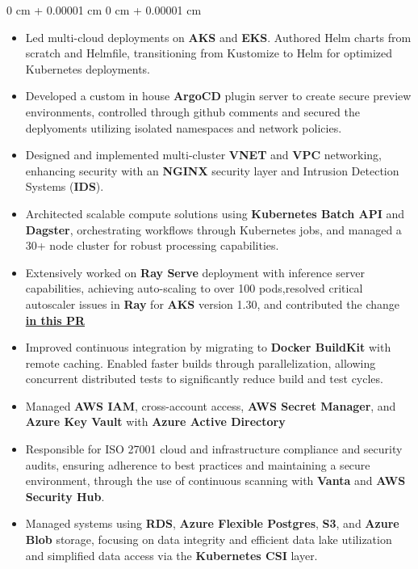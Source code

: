 \documentclass[10pt, letterpaper]{article}
\newenvironment{highlights}{ \begin{itemize}[ topsep=0.10 cm, parsep=0.10 cm, partopsep=0pt,
itemsep=0pt, leftmargin=0 cm + 10pt ] }{ \end{itemize} } %
\newenvironment{onecolentry}{ \begin{adjustwidth}{ 0 cm + 0.00001 cm }{ 0 cm + 0.00001 cm }
}{ \end{adjustwidth} } %
\begin{document}
	\vspace{0.10 cm}
	\begin{onecolentry}
		\begin{highlights}
				\item Led multi-cloud deployments on \textbf{AKS} and \textbf{EKS}. Authored Helm charts from scratch and Helmfile, transitioning from Kustomize to Helm for optimized Kubernetes deployments.
				
				\item Developed a custom in house \textbf{ArgoCD} plugin server to create secure preview environments, controlled through github comments and secured the deplyoments utilizing isolated namespaces and network policies.
				
				\item Designed and implemented multi-cluster \textbf{VNET} and \textbf{VPC} networking, enhancing security with an \textbf{NGINX} security layer and Intrusion Detection Systems (\textbf{IDS}).
				
				\item Architected scalable compute solutions using \textbf{Kubernetes Batch API} and \textbf{Dagster}, orchestrating workflows through Kubernetes jobs, and managed a 30+ node cluster for robust processing capabilities.
				
				\item Extensively worked on \textbf{Ray Serve} deployment with inference server capabilities, achieving auto-scaling to over 100 pods,resolved critical autoscaler issues in \textbf{Ray} for \textbf{AKS} version 1.30, and contributed the change \textbf{ \href{https://github.com/ray-project/ray/pull/48481}{in this PR}} 
				
				\item Improved continuous integration by migrating to \textbf{Docker BuildKit} with remote caching. Enabled faster builds through parallelization, allowing concurrent distributed tests to significantly reduce build and test cycles.
				
				\item Managed \textbf{AWS IAM}, cross-account access, \textbf{AWS Secret Manager}, and \textbf{Azure Key Vault} with \textbf{Azure Active Directory}
			  \item Responsible for ISO 27001 cloud and infrastructure compliance and security audits, ensuring adherence to best practices and maintaining a secure environment, through the use of continuous scanning with \textbf{Vanta} and \textbf{AWS Security Hub}.
				\item Managed systems using \textbf{RDS}, \textbf{Azure Flexible Postgres}, \textbf{S3}, and \textbf{Azure Blob} storage, focusing on data integrity and efficient data lake utilization and simplified data access via the \textbf{Kubernetes CSI} layer.
				

\end{highlights}
\end{onecolentry}
\end{document}
